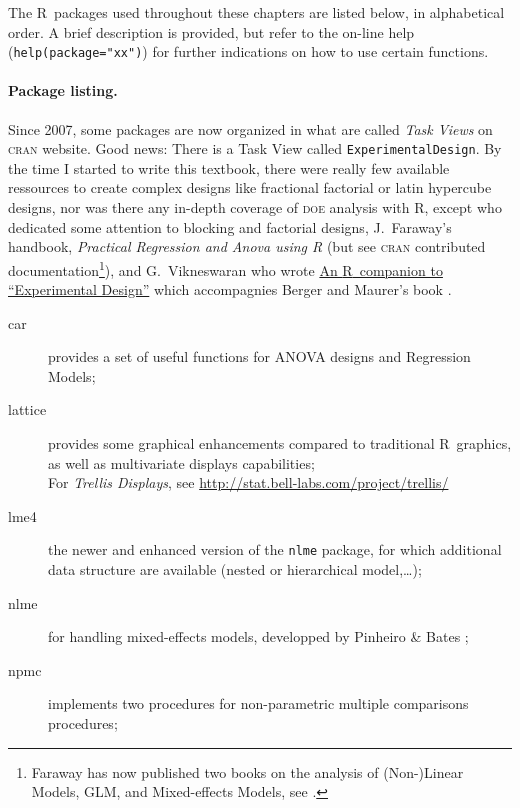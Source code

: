 \documentclass[11pt,a4paper]{memoir}\usepackage[]{graphicx}\usepackage[]{color}
\newcommand{\R}{\textsf{R}}
\begin{document}
The \R\ packages used throughout these chapters are listed below, in
alphabetical order. A brief description is provided, but refer to the
on-line help (\verb|help(package="xx")|) for further indications on
how to use certain functions. 

\paragraph{Package listing.}
Since 2007, some packages are now organized in what are called
\emph{Task Views} on \textsc{cran} website. Good news: There is a Task View
called \verb|ExperimentalDesign|. By the time I started to write this
textbook, there were really few available ressources to create complex
designs like fractional factorial or latin hypercube designs, nor was
there any in-depth coverage of \textsc{doe} analysis with \R, except
\autocite{Venables:2002} who dedicated some attention to blocking and
factorial designs, J.~Faraway's handbook, \emph{Practical Regression
and Anova using \R} \autocite{Faraway:2002} (but see \textsc{cran}
contributed documentation\footnote{Faraway has now published two books
on the analysis of (Non-)Linear Models, GLM, and Mixed-effects Models, see
\autocite{Faraway:2005,Faraway:2006}.}), and G.~Vikneswaran who wrote
\href{http://cran.r-project.org/doc/contrib/Vikneswaran-ED_companion.pdf}{An
\R\ companion to ``Experimental Design''} which accompagnies Berger
and Maurer's book \autocite{Berger:2002}.

\begin{description}
\item[car] provides a set of useful functions for ANOVA designs and
  Regression Models;
\item[lattice] provides some graphical enhancements compared to
  traditional \R\ graphics, as well as multivariate displays
  capabilities;\\
  For \emph{Trellis Displays}, see
  \url{http://stat.bell-labs.com/project/trellis/}
\item[lme4] the newer and enhanced version of the \verb|nlme| package,
  for which additional data structure are available (nested or
  hierarchical model,\ldots);
\item[nlme] for handling mixed-effects models, developped by Pinheiro
  \& Bates \autocite{Pinheiro:2000};
\item[npmc] implements two procedures for non-parametric multiple
  comparisons procedures;
\end{description}
\end{document}
